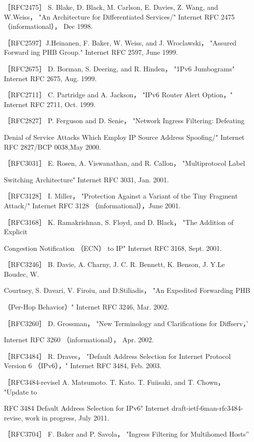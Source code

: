 ［RFC2475］ S. Blake, D. Black, M. Carlson, E. Davies, Z. Wang, and W.Weiss， "An
Architecture for Differentiated Services/" Internet RFC 2475 （informational）， Dec
1998.

［RFC2597］J.Heinanen, F. Baker, W. Weiss, and J. Wroclawski， "Assured Forward
ing PHB Group." Internet RFC 2597, June 1999.

［RFC2675］ D. Borman, S. Deering, and R. Hinden， "1Pv6 Jumbograms" Internet
RFC 2675, Aug. 1999.

［RFC2711］ C. Partridge and A. Jackson， "IPv6 Router Alert Option，" Internet RFC
2711, Oct. 1999.

［RFC2827］ P. Ferguson and D. Senie， "Network Ingress Filtering: Defeating

Denial of Service Attacks Which Employ IP Source Address Spoofing/" Internet
RFC 2827/BCP 0038,May 2000.

［RFC3031］ E. Rosen, A. Viswanathan, and R. Callon， "Multiprotocol Label

Switching Architecture" Internet RFC 3031, Jan. 2001.

［RFC3128］ I. Miller， "Protection Against a Variant of the Tiny Fragment Attack/"
Internet RFC 3128 （informational），June 2001.

［RFC3168］ K. Ramakrishnan, S. Floyd, and D. Black， "The Addition of Explicit

Congestion Notification （ECN） to IP" Internet RFC 3168, Sept. 2001.

［RFC3246］ B. Davie, A. Charny, J. C. R. Bennett, K. Benson, J. Y.Le Boudec, W.

Courtney, S. Davari, V. Firoiu, and D.Stiliadis， "An Expedited Forwarding PHB

（Per-Hop Behavior）" Internet RFC 3246, Mar. 2002.

［RFC3260］ D. Grossman， "New Terminology and Clarifications for Diffserv，'

Internet RFC 3260 （informational）， Apr. 2002.

［RFC3484］ R. Draves， "Default Address Selection for Internet Protocol Version 6
（IPv6），" Internet RFC 3484, Feb. 2003.

［RFC3484-revisel A. Matsumoto. T. Kato. T. Fuiisaki, and T. Chown， "Update to

RFC 3484 Default Address Selection for IPv6" Internet draft-ietf-6man-rfc3484-
revise, work in progress, July 2011.

［RFC3704］ F. Baker and P. Savola， "Ingress Filtering for Multihomed Hosts”

